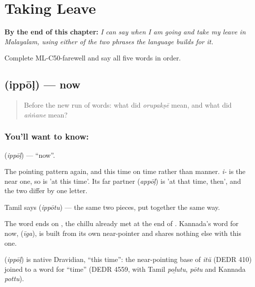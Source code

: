 
\chapter{Taking Leave}
\label{ch:ml-taking-leave}

\begin{chapteropening}
\textbf{By the end of this chapter:} \emph{I can say when I am going and take my leave in Malayalam, using either of the two phrases the language builds for it.}

Complete ML-C50-farewell and say all five words in order.
\end{chapteropening}

\section[\texorpdfstring{\ml{ഇപ്പോൾ} (ippōḷ)}{ഇപ്പോൾ (ippōḷ)}]{ (ippōḷ) — now}

\label{lesson:ML-C50-now}



\begin{quote}
Before the new run of words: what did \emph{orupakṣē} mean, and what did \emph{aṅṅane} mean?
\end{quote}

\subsection*{You'll want to know: }
\textbf{} (\emph{ippōḷ}) — \textquotedblleft{}now\textquotedblright{}.

The pointing pattern again, and this time on time rather than manner. \emph{i-} is the near one, so  is 'at this time'. Its far partner  (\emph{appōḷ}) is 'at that time, then', and the two differ by one letter.

Tamil says  (\emph{ippōtu}) — the same two pieces, put together the same way.

The word ends on , the chillu already met at the end of . Kannada's word for now,  (\emph{īga}), is built from its own near-pointer and shares nothing else with this one.

\begin{cousinweb}
\textbf{} (\emph{ippōḷ}) is native Dravidian, \textquotedblleft{}this time\textquotedblright{}: the near-pointing base of \emph{itŭ} (DEDR 410) joined to a word for \textquotedblleft{}time\textquotedblright{} (DEDR 4559, with Tamil \emph{poḻutu}, \emph{pōtu} and Kannada \emph{pottu}).
\end{cousinweb}

